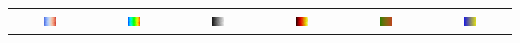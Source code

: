 \documentclass{llncs}
\begin{document}
\begin{plate*}
\begin{tabular}{c@{\,}c@{\,}c@{\,}c@{\,}c@{\,}c}
    \includegraphics[width=0.16\textwidth]{images/Cool2WarmHfNoise} &
    \includegraphics[width=0.16\textwidth]{images/RainbowHfNoise} &
    \includegraphics[width=0.16\textwidth]{images/GrayscaleHfNoise} &
    \includegraphics[width=0.16\textwidth]{images/BlackBodyHfNoise} &
    \includegraphics[width=0.16\textwidth]{images/Green2RedHfNoise} &
    \includegraphics[width=0.16\textwidth]{images/Blue2YellowHfNoise} \\


\end{tabular}
\end{plate*}
\end{document}

